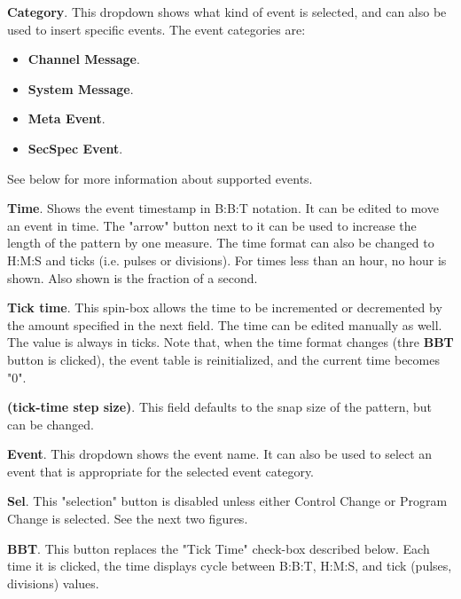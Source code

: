    \begin{enumber}
      \item \textbf{Category}.
         This dropdown shows what kind of event is selected, and can
         also be used to insert specific events. The event categories are:
         \begin{itemize}
            \item \textbf{Channel Message}.
            \item \textbf{System Message}.
            \item \textbf{Meta Event}.
            \item \textbf{SecSpec Event}.
         \end{itemize}
         See below for more information about supported events.
      \item \textbf{Time}.
         Shows the event timestamp in B:B:T notation.
         It can be edited to move an event in time.
         The "arrow" button next to it can be used to increase the length
         of the pattern by one measure.
         The time format can also be changed to H:M:S and ticks
         (i.e. pulses or divisions).
         For times less than an hour, no hour is shown.
         Also shown is the fraction of a second.
      \item \textbf{Tick time}.
         This spin-box allows the time to be incremented or decremented
         by the amount specified in the next field.
         The time can be edited manually as well.
         The value is always in ticks.
         Note that, when the time format
         changes (thre \textbf{BBT} button is clicked),
         the event table is reinitialized, and the current time becomes
         "0".
      \item \textbf{(tick-time step size)}.
         This field defaults to the snap size of the pattern, but can
         be changed.
      \item \textbf{Event}.
         This dropdown shows the event name.
         It can also be used to select an event that is appropriate for
         the selected event category.
      \item \textbf{Sel}.
         This "selection" button is disabled unless either Control Change
         or Program Change is selected.
         See the next two figures.
      \item \textbf{BBT}.
         This button replaces the "Tick Time" check-box described below.
         Each time it is clicked, the time displays cycle between
         B:B:T, H:M:S, and tick (pulses, divisions) values.

\end{enumber}
